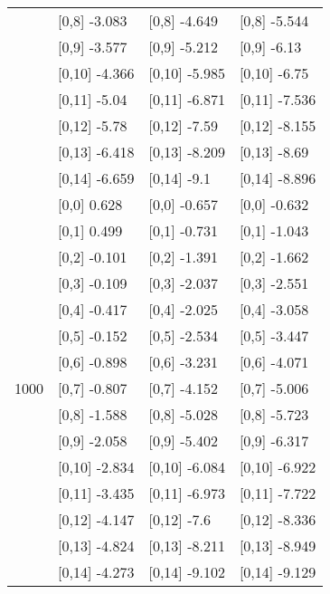 \begin{table}
\begin{tabular}[t]{llll}
 & {}[0,8] -3.083 & {}[0,8] -4.649 & {}[0,8] -5.544\\
 & {}[0,9] -3.577 & {}[0,9] -5.212 & {}[0,9] -6.13\\
\addlinespace
 & {}[0,10] -4.366 & {}[0,10] -5.985 & {}[0,10] -6.75\\
 & {}[0,11] -5.04 & {}[0,11] -6.871 & {}[0,11] -7.536\\
 & {}[0,12] -5.78 & {}[0,12] -7.59 & {}[0,12] -8.155\\
 & {}[0,13] -6.418 & {}[0,13] -8.209 & {}[0,13] -8.69\\
 & {}[0,14] -6.659 & {}[0,14] -9.1 & {}[0,14] -8.896\\
\addlinespace
 & {}[0,0] 0.628 & {}[0,0] -0.657 & {}[0,0] -0.632\\
 & {}[0,1] 0.499 & {}[0,1] -0.731 & {}[0,1] -1.043\\
 & {}[0,2] -0.101 & {}[0,2] -1.391 & {}[0,2] -1.662\\
 & {}[0,3] -0.109 & {}[0,3] -2.037 & {}[0,3] -2.551\\
 & {}[0,4] -0.417 & {}[0,4] -2.025 & {}[0,4] -3.058\\
\addlinespace
 & {}[0,5] -0.152 & {}[0,5] -2.534 & {}[0,5] -3.447\\
 & {}[0,6] -0.898 & {}[0,6] -3.231 & {}[0,6] -4.071\\
1000 & {}[0,7] -0.807 & {}[0,7] -4.152 & {}[0,7] -5.006\\
 & {}[0,8] -1.588 & {}[0,8] -5.028 & {}[0,8] -5.723\\
 & {}[0,9] -2.058 & {}[0,9] -5.402 & {}[0,9] -6.317\\
\addlinespace
 & {}[0,10] -2.834 & {}[0,10] -6.084 & {}[0,10] -6.922\\
 & {}[0,11] -3.435 & {}[0,11] -6.973 & {}[0,11] -7.722\\
 & {}[0,12] -4.147 & {}[0,12] -7.6 & {}[0,12] -8.336\\
 & {}[0,13] -4.824 & {}[0,13] -8.211 & {}[0,13] -8.949\\
 & {}[0,14] -4.273 & {}[0,14] -9.102 & {}[0,14] -9.129\\
\bottomrule
\end{tabular}
\end{table}
